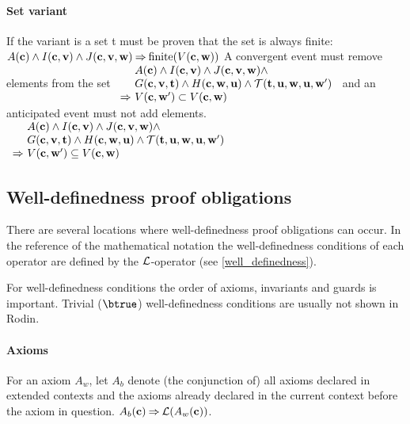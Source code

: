 \paragraph{Set variant}
\label{set_variant}
  If the variant is a set t must be proven that the set is always finite:
%
  {$A(\mathbf{c}) \land I(\mathbf{c},\mathbf{v}) \land J(\mathbf{c},\mathbf{v},\mathbf{w}) \mathbin\Rightarrow \mathrm{finite}(V(\mathbf{c},\mathbf{w}))$}
A convergent event must remove elements from the set
%
  {$\begin{array}{r@{\ }l}
      & \axioms \land \absinvariants \land \concinvariants \land \\
      & \absguards \land \concguards \land \bapred \\
      \limp & V(\allconstants,\concvariables')\subset V(\allconstants,\concvariables)
    \end{array}$}
and an anticipated event must not add elements.
%
  {$\begin{array}{r@{\ }l}
      & \axioms \land \absinvariants \land \concinvariants \land \\
      & \absguards \land \concguards \land \bapred \\
      \limp & V(\allconstants,\concvariables')\subseteq V(\allconstants,\concvariables)
    \end{array}$}

\subsection{Well-definedness proof obligations}
\label{well_definedness_proof_obligations}
There are several locations where well-definedness proof obligations can occur.
In the reference of the mathematical notation the well-definedness conditions
of each operator are defined by the $\mathcal{L}$-operator (see \ref{well_definedness}).

For well-definedness conditions the order of axioms, invariants and guards is important.
Trivial ($\btrue$) well-definedness conditions are usually not shown in Rodin.

\paragraph{Axioms}
\label{well_definedness_of_axioms}
For an axiom $A_w$, 
  let $A_b$ denote (the conjunction of) all axioms declared
  in extended contexts and the axioms already declared in
  the current context before the axiom in question.
%
  {$A_b(\mathbf{c}) \mathbin\Rightarrow \mathcal{L}(A_w(\mathbf{c}))$}.


